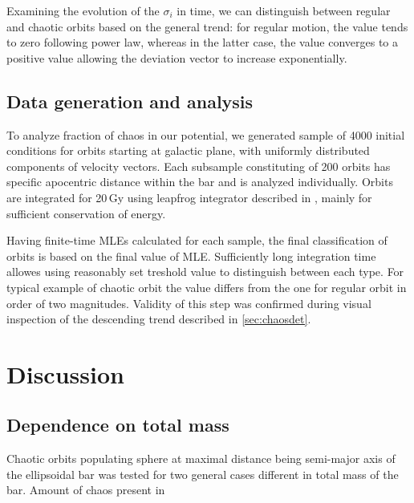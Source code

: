 \documentclass[a4paper,fleqn,usenatbib]{mnras}
\begin{document}
Examining the evolution of the $ \sigma_i $ in time, we can distinguish between regular and chaotic orbits based on the general trend: for regular motion, the value tends to zero following power law, whereas in the latter case, the value converges to a positive value allowing the deviation vector to increase exponentially.

\subsection{Data generation and analysis}

To analyze fraction of chaos in our potential, we generated sample of 4000 initial conditions for orbits starting at galactic plane, with uniformly distributed components of velocity vectors. Each subsample constituting of 200 orbits has specific apocentric distance within the bar and is analyzed individually. Orbits are integrated for 20\,Gy using leapfrog integrator described in \cite{BinneyTremaine:2008}, mainly for sufficient conservation of energy.

Having finite-time MLEs calculated for each sample, the final classification of orbits is based on the final value of MLE. Sufficiently long integration time allowes using reasonably set treshold value to distinguish between each type. For typical example of chaotic orbit the value differs from the one for regular orbit in order of two magnitudes. Validity of this step was confirmed during visual inspection of the descending trend described in \ref{sec:chaosdet}.

\section{Discussion}

\subsection{Dependence on total mass}
Chaotic orbits populating sphere at maximal distance being semi-major axis of the ellipsoidal bar was tested for two general cases different in total mass of the bar. Amount of chaos present in 
\end{document}
